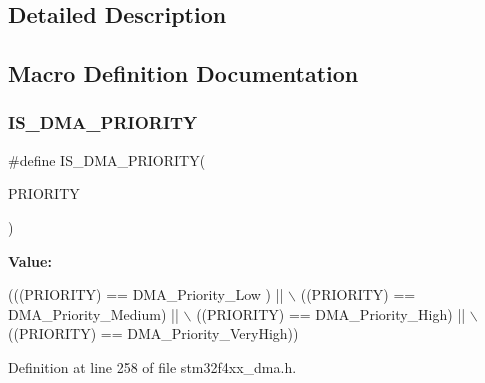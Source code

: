 \subsection{Detailed Description}


\subsection{Macro Definition Documentation}
\mbox{\label{group___d_m_a__priority__level_gaa1cae2ab458948511596467c87cd02b6}} 
\subsubsection{\texorpdfstring{I\+S\+\_\+\+D\+M\+A\+\_\+\+P\+R\+I\+O\+R\+I\+TY}{IS\_DMA\_PRIORITY}}
{\footnotesize\ttfamily \#define I\+S\+\_\+\+D\+M\+A\+\_\+\+P\+R\+I\+O\+R\+I\+TY(\begin{DoxyParamCaption}\item[{}]{P\+R\+I\+O\+R\+I\+TY }\end{DoxyParamCaption})}

{\bfseries Value\+:}
\begin{DoxyCode}
(((PRIORITY) == DMA\_Priority\_Low )   || \(\backslash\)
                                   ((PRIORITY) == DMA\_Priority\_Medium) || \(\backslash\)
                                   ((PRIORITY) == DMA\_Priority\_High)   || \(\backslash\)
                                   ((PRIORITY) == DMA\_Priority\_VeryHigh))
\end{DoxyCode}


Definition at line 258 of file stm32f4xx\+\_\+dma.\+h.

